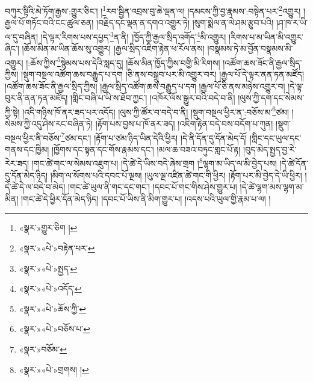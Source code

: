བཀུར་སྟིའི་མེ་ཏོག་རྒྱས་:གྱུར་ཅིང་། །\footnote{«སྣར་»གྱུར་ཅིག །}རབ་སྦྱིན་འབྲས་བུ་ཆེ་ལྡན་ལ། །དམངས་ཀྱི་བྱ་རྣམས་:བསྟེན་པར་\footnote{«སྣར་»«པེ་»བརྟེན་པར་}འགྱུར། །རྒྱལ་པོ་གཏོང་བའི་ངང་ཚུལ་ཅན། །བརྗིད་དང་ལྡན་ན་དགའ་འགྱུར་ཏེ། །སུག་སྨེལ་ན་ལེ་ཤམ་རྩུབ་པའི། །ཤ་ཁ་ར་ཡི་ལ་དུ་བཞིན། །དེ་ལྟར་རིགས་པས་དཔྱད་\footnote{«སྣར་»«པེ་»སྤྱད་}ན་ནི། །ཁྱོད་ཀྱི་རྒྱལ་སྲིད་འགོད་\footnote{«སྣར་»«པེ་»འདོད་}མི་འགྱུར། །རིགས་པ་མ་ཡིན་མི་འགྱུར་ཞིང་། །ཆོས་མིན་མ་ཡིན་ཆོས་སུ་འགྱུར། །རྒྱལ་སྲིད་འཇིག་རྟེན་ཕ་རོལ་ནས། །བསྣམས་ཏེ་མ་བྱོན་བསྣམས་མི་འགྱུར། །:ཆོས་ཀྱིས་\footnote{«སྣར་»«པེ་»ཆོས་ཀྱི་}སྙེམས་པས་དེའི་སླད་དུ། །ཆོས་མིན་ཁྱོད་ཀྱིས་བགྱི་མི་རིགས། །འཚོག་ཆས་ཟོང་ནི་རྒྱལ་སྲིད་ཀྱིས། །སྡུག་བསྔལ་འཚོག་ཆས་བརྒྱུད་པ་དག །ཅི་ནས་བསྒྲུབ་པར་མི་འགྱུར་བར། །རྒྱལ་པོ་དེ་ལྟར་ནན་ཏན་མཛོད། །འཚོག་ཆས་ཟོང་ནི་རྒྱལ་སྲིད་ཀྱིས། །རྒྱལ་སྲིད་འཚོག་ཆས་བརྒྱུད་པ་དག །རྒྱལ་པོ་ཅི་ནས་མཉེས་འགྱུར་བ། །དེ་ལྟ་བུར་ནི་ནན་ཏན་མཛོད། །གླིང་བཞི་པ་ཡི་ས་ཐོབ་ཀྱང་། །འཁོར་ལོས་སྒྱུར་བའི་བདེ་བ་ནི། །ལུས་ཀྱི་དག་དང་སེམས་ཀྱི་སྟེ། །འདི་གཉིས་ཁོ་ནར་ཟད་པར་འདོད། །ལུས་ཀྱི་ཚོར་བ་བདེ་བ་ནི། །སྡུག་བསྔལ་ཕྱིར་ན་:བཅོས་མ་\footnote{«སྣར་»«པེ་»བཅོས་པ་}ཙམ། །སེམས་ཀྱི་འདུ་ཤེས་རང་བཞིན་ཏེ། །རྟོག་པས་བྱས་པ་ཁོ་ནར་ཟད། །འཇིག་རྟེན་བདེ་བས་བདོག་པ་ཀུན། །སྡུག་བསྔལ་ཕྱིར་ནི་བཅོས་\footnote{«སྣར་»བཅོམ་}ཙམ་དང་། །རྟོག་པ་ཙམ་ཉིད་ཡིན་དེའི་ཕྱིར། །དེ་ནི་དོན་དུ་དོན་མེད་དོ། །གླིང་དང་ཡུལ་དང་གནས་དང་ཁྱིམ། །ཁྱོགས་དང་སྟན་དང་གོས་རྣམས་དང་། །མལ་ཆ་བཟའ་བཏུང་གླང་པོ་རྟ། །བུད་མེད་སྤྱད་བྱ་རེ་རེར་ཟད། །གང་ཚེ་གང་ལ་སེམས་འཇུག་པ། །དེ་ཚེ་དེ་ཡིས་བདེ་ཞེས་གྲག །\footnote{«སྣར་»«པེ་»གྲགས། །}ལྷག་མ་ཡིད་ལ་མི་བྱེད་པས། །དེ་ཚེ་དོན་དུ་དོན་མེད་ཉིད། །མིག་ལ་སོགས་པའི་དབང་པོ་ལྔས། །ཡུལ་ལྔ་འཛིན་ཚེ་གང་གི་ཕྱིར། །རྟོག་པར་མི་བྱེད་དེ་ཡི་ཕྱིར། །དེ་ཚེ་དེ་ལ་བདེ་བ་མེད། །གང་ཚེ་ཡུལ་ནི་གང་དང་གང་། །དབང་པོ་གང་གིས་ཤེས་གྱུར་པ། །དེ་ཚེ་ལྷག་མས་ལྷག་མ་མིན། །གང་ཚེ་དེ་ཕྱིར་དོན་མེད་ཉིད། །དབང་པོ་ཡིས་ནི་མིག་གྱུར་པ། །འདས་པའི་ཡུལ་གྱི་རྣམ་པ་ལ། །
